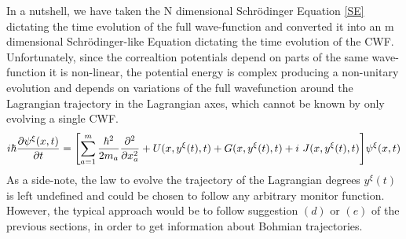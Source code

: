 \documentclass[11pt, a4paper]{article} %
\begin{document}
In a nutshell, we have taken the N dimensional Schrödinger Equation \eqref{SE} dictating the time evolution of the full wave-function and converted it into an m dimensional Schrödinger-like Equation dictating the time evolution of the CWF. Unfortunately, since the correaltion potentials depend on parts of the same wave-function it is non-linear, the potential energy is complex producing a non-unitary evolution and depends on variations of the full wavefunction around the Lagrangian trajectory in the Lagrangian axes, which cannot be known by only evolving a single CWF.
\begin{equation}\label{SE.GJ}
i \hbar \pdv{\psi^\xi (x,t)}{t} = \qty[\sum_{a=1}^m\frac{\hbar^2}{2m_a} \pdv[2]{}{x_a} +  U(x, y^\xi(t),t) + G(x, y^\xi(t),t)+i\ J(x, y^\xi(t),t)] \psi^\xi (x,t)
\end{equation}
As a side-note, the law to evolve the trajectory of the Lagrangian degrees $y^\xi(t)$ is left undefined and could be chosen to follow any arbitrary monitor function. However, the typical approach would be to follow suggestion $(d)$ or $(e)$  of the previous sections, in order to get information about Bohmian trajectories.
\end{document}
